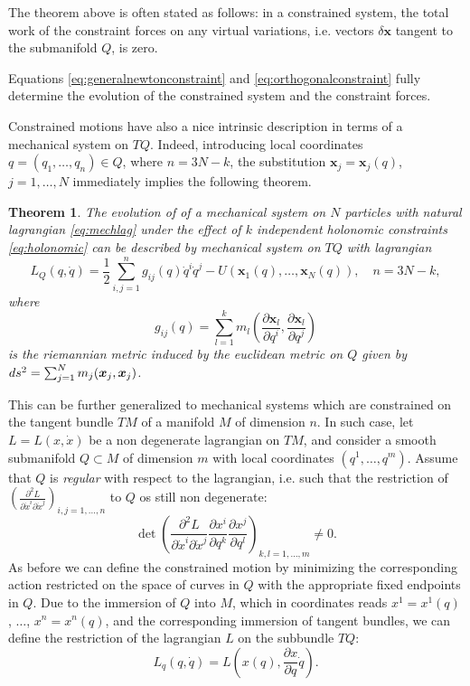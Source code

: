 \documentclass[english,fontsize=11pt,paper=a5,oneside]{scrbook}
\newcommand{\bx}{\bm{x}}
\let\d\relax
\DeclareMathOperator{\d}{d}
\newtheorem{theorem}{Theorem}[chapter]
\theoremstyle{definition}
\newenvironment{remark}
  {\pushQED{\qed}\renewcommand{\qedsymbol}{$\lozenge$}\remarkx}
  {\popQED\endremarkx}
\begin{document}
\begin{remark}
    The theorem above is often stated as follows: in a constrained system, the total work of the constraint forces on any virtual variations, i.e. vectors $\delta\bx$ tangent to the submanifold $Q$, is zero.
\end{remark}

Equations \eqref{eq:generalnewtonconstraint} and \eqref{eq:orthogonalconstraint} fully determine the evolution of the constrained system and the constraint forces.

Constrained motions have also a nice intrinsic description in terms of a mechanical system on $TQ$. Indeed, introducing local coordinates $q= (q_1, \ldots, q_n)\in Q$, where $n = 3N-k$, the substitution $\bx_j = \bx_j(q)$, $j=1,\ldots,N$ immediately implies the following theorem.

\begin{theorem}
    The evolution of of a mechanical system on $N$ particles with natural lagrangian \eqref{eq:mechlag} under the effect of $k$ independent holonomic constraints \eqref{eq:holonomic} can be described by mechanical system on $TQ$ with lagrangian
    \begin{equation}
        L_Q(q,\dot q) = \frac12 \sum_{i,j=1}^n g_{ij}(q)\dot q^i \dot q^j - U(\bx_1(q),\ldots,\bx_N(q)), \quad n = 3N-k,
    \end{equation}
    where
    \begin{equation}
        g_{ij}(q) = \sum_{l=1}^k m_l\left(\frac{\partial \bx_l}{\partial q^i},\frac{\partial \bx_l}{\partial q^j}\right)
    \end{equation}
    is the riemannian metric induced by the euclidean metric on $Q$ given by
    $ds^2 = \sum_{j=1}^N m_j(\d \bx_j, \d\bx_j)$.
\end{theorem}

This can be further generalized to mechanical systems which are constrained on the tangent bundle $TM$ of a manifold $M$ of dimension $n$.
In such case, let  $L=L(x,\dot x)$ be a non degenerate lagrangian on $TM$, and consider a smooth submanifold $Q\subset M$ of dimension $m$ with local coordinates $(q^1,\ldots,q^m)$.
Assume that $Q$ is \emph{regular} with respect to the lagrangian, i.e. such that the restriction of $\left(\frac{\partial^2 L}{\partial \dot x^i \partial\dot x^j}\right)_{i,j=1,\ldots,n}$ to $Q$ os still non degenerate:
\begin{equation}
    \det\left(\frac{\partial^2 L}{\partial \dot x^i \partial\dot x^j}\frac{\partial x^i}{\partial q^k}\frac{\partial x^j}{\partial q^l}\right)_{k,l=1,\ldots,m} \neq 0.
\end{equation}
As before we can define the constrained motion by minimizing the corresponding action restricted on the space of curves in $Q$ with the appropriate fixed endpoints in $Q$. Due to the immersion of $Q$ into $M$, which in coordinates reads $x^1 = x^1(q)$, $\ldots$, $x^n=x^n(q)$, and the corresponding immersion of tangent bundles, we can define the restriction of the lagrangian $L$ on the subbundle $TQ$:
\begin{equation}\label{eq:dalembertmanifold}
    L_q(q,\dot q) = L\left(x(q), \frac{\partial x}{\partial q}\dot q\right).
\end{equation}
\end{document}
